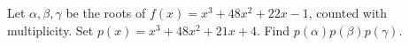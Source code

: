 Let $\alpha,\beta,\gamma$ be the roots of $f(x)=x^3+48x^2+22x-1$, counted with multiplicity. Set $p(x)=x^3+48x^2+21x+4$. Find $p(\alpha)p(\beta)p(\gamma)$.
